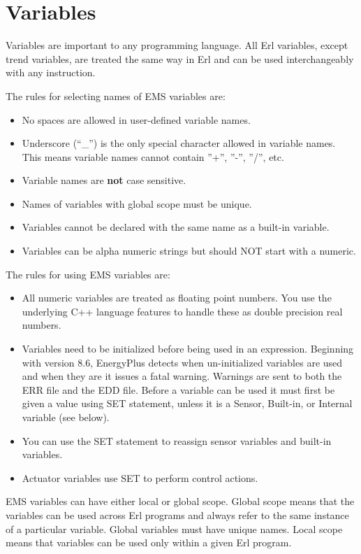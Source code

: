 \section{Variables}\label{variables}

Variables are important to any programming language. All Erl variables, except trend variables, are treated the same way in Erl and can be used interchangeably with any instruction.

The rules for selecting names of EMS variables are:

\begin{itemize}
\item
  No spaces are allowed in user-defined variable names.
\item
  Underscore (``\_'') is the only special character allowed in variable names.  This means variable names cannot contain ''+'', ''-'', ''/'', etc.
\item
  Variable names are \textbf{not} case sensitive.
\item
  Names of variables with global scope must be unique.
\item
  Variables cannot be declared with the same name as a built-in variable.
\item
  Variables can be alpha numeric strings but should NOT start with a numeric.
\end{itemize}

The rules for using EMS variables are:

\begin{itemize}
\item
  All numeric variables are treated as floating point numbers. You use the underlying C++ language features to handle these as double precision real numbers.
\item
  Variables need to be initialized before being used in an expression.  Beginning with version 8.6, EnergyPlus detects when un-initialized variables are used and when they are it issues a fatal warning.  Warnings are sent to both the ERR file and the EDD file.  Before a variable can be used it must first be given a value using SET statement, unless it is a Sensor, Built-in, or Internal variable (see below).
\item
  You can use the SET statement to reassign sensor variables and built-in variables.
\item
  Actuator variables use SET to perform control actions.
\end{itemize}

EMS variables can have either local or global scope. Global scope means that the variables can be used across Erl programs and always refer to the same instance of a particular variable. Global variables must have unique names. Local scope means that variables can be used only within a given Erl program.


